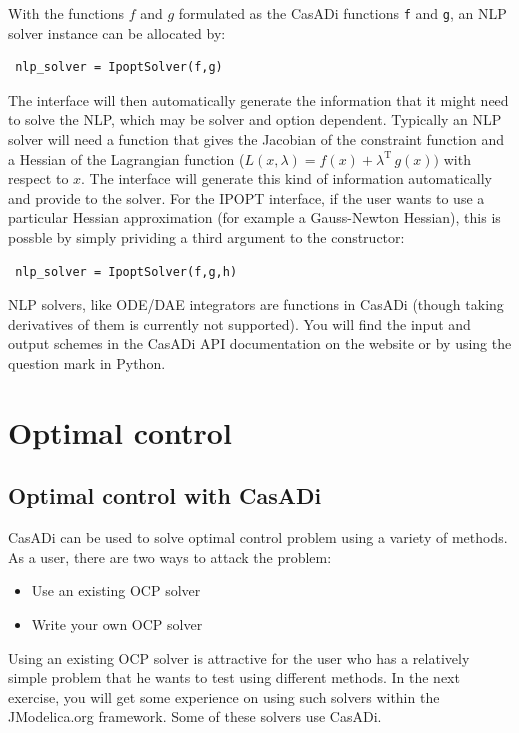 \documentclass[a4paper,12pt]{book}
\begin{document}
{With the functions $f$ and $g$ formulated as the CasADi functions \texttt{f} and \texttt{g}, an NLP solver instance can be allocated by:
\begin{verbatim}
 nlp_solver = IpoptSolver(f,g)
\end{verbatim}

The interface will then automatically generate the information that it might need to solve the NLP, which may be solver and option dependent. Typically an NLP solver will need a function that gives the Jacobian of the constraint function and a Hessian of the Lagrangian function ($L(x,\lambda) = f(x) + \lambda^{\text{T}} \, g(x))$ with respect to $x$. The interface will generate this kind of information automatically and provide to the solver. For the IPOPT interface, if the user wants to use a particular Hessian approximation (for example a Gauss-Newton Hessian), this is possble by simply prividing a third argument to the constructor:
\begin{verbatim}
 nlp_solver = IpoptSolver(f,g,h)
\end{verbatim}

NLP solvers, like ODE/DAE integrators are functions in CasADi (though taking derivatives of them is currently not supported). You will find the input and output schemes in the CasADi API documentation on the website or by using the question mark in Python.

\chapter{Optimal control}

\section{Optimal control with CasADi}
CasADi can be used to solve optimal control problem using a variety of methods. As a user, there are two ways to attack the problem:
\begin{itemize}
  \item Use an existing OCP solver
  \item Write your own OCP solver
\end{itemize}

Using an existing OCP solver is attractive for the user who has a relatively simple problem that he wants to test using different methods. In the next exercise, you will get some experience on using such solvers within the JModelica.org framework. Some of these solvers use CasADi.

}
\end{document}
